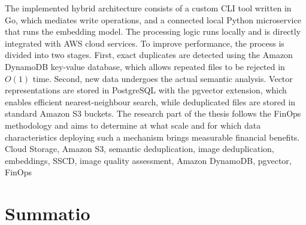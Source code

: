 \documentclass[
    bindingoffset=5mm,  %
    footnoteindent=3mm, %
    hyphenation=true    %
]{src/wut-thesis}
\begin{document}
The implemented hybrid architecture consists of a custom CLI tool written in Go, which mediates write operations, and a connected local Python microservice that runs the embedding model. The processing logic runs locally and is directly integrated with AWS cloud services. To improve performance, the process is divided into two stages. First, exact duplicates are detected using the Amazon DynamoDB key-value database, which allows repeated files to be rejected in $O(1)$ time. Second, new data undergoes the actual semantic analysis. Vector representations are stored in PostgreSQL with the pgvector extension, which enables efficient nearest-neighbour search, while deduplicated files are stored in standard Amazon S3 buckets. The research part of the thesis follows the FinOps methodology and aims to determine at what scale and for which data characteristics deploying such a mechanism brings measurable financial benefits.
\secondkeywords Cloud Storage, Amazon S3, semantic deduplication, image deduplication, embeddings, SSCD, image quality assessment, Amazon DynamoDB, pgvector, FinOps

\pagestyle{plain}

\cleardoublepage %
\tableofcontents

\cleardoublepage %
\pagestyle{headings}





\clearpage %
\section{Summatio}
\lipsum[4-10]

\cleardoublepage %
\printbibliography
\clearpage

\acronymlist
{}
\vspace{0.8cm}
\end{document}
